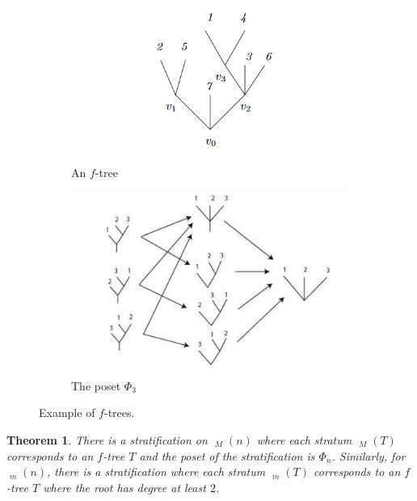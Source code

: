 \documentclass{scrartcl}
\theoremstyle{plain}
\newtheorem{theorem}{Theorem}[section]
\theoremstyle{definition}
\DeclareMathOperator{\cConf}{\overline{Conf}}
\begin{document}
\begin{figure}[ht]
    \centering
    \begin{subfigure}[b]{0.45\textwidth}
        \centering
        \includegraphics[width=\textwidth]{img/sinha-tree}
        \caption{An $f$-tree}
    \end{subfigure}
    \hfill
    \begin{subfigure}[b]{0.45\textwidth}
        \centering
        \includegraphics[width=\textwidth]{img/sinha-tree-poset}
        \caption{The poset $\Phi_3$ }
    \end{subfigure} 
    \caption{Example of $f$-trees. }\label{sinha-trees}
\end{figure}


\begin{theorem}
    There is a stratification on $\cConf_M(n)$ where each stratum $\cConf_M(T)$ corresponds to an $f$-tree $T$ and the poset of the stratification is $\Phi_n$. Similarly, for $\cConf_m(n)$, there is a stratification where each stratum $\cConf_m(T)$ corresponds to an $f$-tree $T$ where the root has degree at least $2$. 
\end{theorem}
\end{document}
